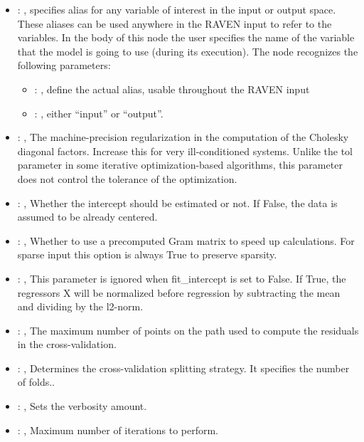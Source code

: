 \begin{itemize}
    \item {}: , 
      specifies alias for         any variable of interest in the input or output space. These
      aliases can be used anywhere in the RAVEN input to         refer to the variables. In the body
      of this node the user specifies the name of the variable that the model is going to use
      (during its execution).
      The  node recognizes the following parameters:
        \begin{itemize}
          \item {}: , 
            define the actual alias, usable throughout the RAVEN input
          \item {}: , 
            either ``input'' or ``output''.
      \end{itemize}

    \item {}: , 
      The machine-precision regularization in the computation of the Cholesky
      diagonal factors. Increase this for very ill-conditioned systems. Unlike the tol
      parameter in some iterative optimization-based algorithms, this parameter does not
      control the tolerance of the optimization.

    \item {}: , 
      Whether the intercept should be estimated or not. If False,
      the data is assumed to be already centered.

    \item {}: , 
      Whether to use a precomputed Gram matrix to speed up calculations.
      For sparse input this option is always True to preserve sparsity.

    \item {}: , 
      This parameter is ignored when fit\_intercept is set to False. If True,
      the regressors X will be normalized before regression by subtracting the mean and
      dividing by the l2-norm.

    \item {}: , 
      The maximum number of points on the path used to compute the
      residuals in the cross-validation.

    \item {}: , 
      Determines the cross-validation splitting strategy.
      It specifies the number of folds..

    \item {}: , 
      Sets the verbosity amount.

    \item {}: , 
      Maximum number of iterations to perform.
  \end{itemize}


